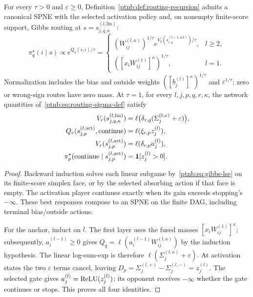 \begin{theoremenv}\label{ptnb:thm:routing-forward}
For every $\tau>0$ and $\varepsilon\geq0$, Definition~\ref{ptnb:def:routing-recursion} admits a canonical SPNE with the selected activation policy and, on nonempty finite-score support, Gibbs routing at $s=s_{j,q,\kappa}^{(l,\mathrm{lin})}$:
\begin{equation}\label{ptnb:eq:routing-spne-linear}
 \pi_q^\star(i\mid s)\propto e^{Q_q(s,i)/\tau}
 =\begin{cases}
 (W_{ij}^{(l,\kappa)})^{1/\tau}e^{V_q(s_{i,q}^{(l-1,\mathrm{act})})/\tau},&l\geq2,\\
 ([x_iW_{ij}^{(1)}]^\kappa)^{1/\tau},&l=1.
 \end{cases}
\end{equation}
Normalization includes the bias and outside weights $([b_j^{(l)}]^\kappa)^{1/\tau}$ and $\varepsilon^{1/\tau}$; zero or wrong-sign routes have zero mass. At $\tau=1$, for every $l,j,p,q,r,\kappa$, the network quantities of~\eqref{ptnb:eq:routing-sigma-def} satisfy
\begin{align}
 V_r(s_{j,q,\kappa}^{(l,\mathrm{lin})})&=\ell\bigl(\delta_{r,q}(\Sigma_j^{(l,\kappa)}+\varepsilon)\bigr),\label{ptnb:eq:routing-forward-linear}\\
 Q_r(s_{j,p}^{(l,\mathrm{act})},\mathrm{continue})&=\ell(\xi_{r,p}z_j^{(l)}),\label{ptnb:eq:routing-forward-continue}\\
 V_r(s_{j,p}^{(l,\mathrm{act})})&=\ell(\delta_{r,p}a_j^{(l)}),\label{ptnb:eq:routing-forward-act}\\
 \pi_p^\star(\mathrm{continue}\mid s_{j,p}^{(l,\mathrm{act})})&=\mathbf{1}[z_j^{(l)}>0].\label{ptnb:eq:routing-forward-stop}
\end{align}
\end{theoremenv}
\begin{proof}
Backward induction solves each linear subgame by~\eqref{ptnb:eq:gibbs-lse} on its finite-score simplex face, or by the selected absorbing action if that face is empty. The activation player continues exactly when its gain exceeds stopping's $-\infty$. These best responses compose to an SPNE on the finite DAG, including terminal bias/outside actions.

For the anchor, induct on $l$. The first layer uses the fused masses $[x_iW_{ij}^{(1)}]^\kappa$; subsequently, $a_i^{(l-1)}\geq0$ gives $Q_q=\ell(a_i^{(l-1)}W_{ij}^{(l,\kappa)})$ by the induction hypothesis. The linear log-sum-exp is therefore $\ell(\Sigma_j^{(l,\kappa)}+\varepsilon)$. At activation states the two $\varepsilon$ terms cancel, leaving $D_p=\Sigma_j^{(l,+)}-\Sigma_j^{(l,-)}=z_j^{(l)}$. The selected gate gives $a_j^{(l)}=\text{ReLU}(z_j^{(l)})$; its opponent receives $-\infty$ whether the gate continues or stops. This proves all four identities.
\end{proof}

